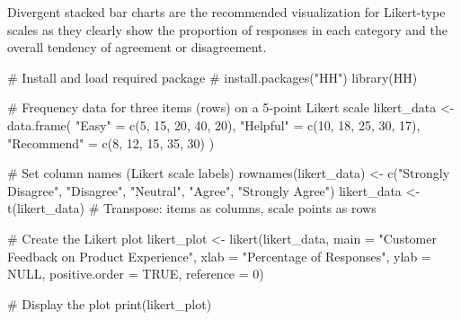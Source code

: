 \documentclass[
  letterpaper,
  DIV=11,
  numbers=noendperiod]{scrartcl}
\newenvironment{Shaded}{\begin{snugshade}}{\end{snugshade}}
\newcommand{\AttributeTok}[1]{\textcolor[rgb]{0.40,0.45,0.13}{#1}}
\newcommand{\CommentTok}[1]{\textcolor[rgb]{0.37,0.37,0.37}{#1}}
\newcommand{\ConstantTok}[1]{\textcolor[rgb]{0.56,0.35,0.01}{#1}}
\newcommand{\DecValTok}[1]{\textcolor[rgb]{0.68,0.00,0.00}{#1}}
\newcommand{\FunctionTok}[1]{\textcolor[rgb]{0.28,0.35,0.67}{#1}}
\newcommand{\NormalTok}[1]{\textcolor[rgb]{0.00,0.23,0.31}{#1}}
\newcommand{\OtherTok}[1]{\textcolor[rgb]{0.00,0.23,0.31}{#1}}
\newcommand{\StringTok}[1]{\textcolor[rgb]{0.13,0.47,0.30}{#1}}
\begin{document}
Divergent stacked bar charts are the recommended visualization for
Likert-type scales as they clearly show the proportion of responses in
each category and the overall tendency of agreement or disagreement.

\begin{Shaded}
\begin{Highlighting}[]
\CommentTok{\# Install and load required package}
\CommentTok{\# install.packages("HH")}
\FunctionTok{library}\NormalTok{(HH)}

\CommentTok{\# Frequency data for three items (rows) on a 5{-}point Likert scale}
\NormalTok{likert\_data }\OtherTok{\textless{}{-}} \FunctionTok{data.frame}\NormalTok{(}
  \StringTok{"Easy"} \OtherTok{=} \FunctionTok{c}\NormalTok{(}\DecValTok{5}\NormalTok{, }\DecValTok{15}\NormalTok{, }\DecValTok{20}\NormalTok{, }\DecValTok{40}\NormalTok{, }\DecValTok{20}\NormalTok{),}
  \StringTok{"Helpful"} \OtherTok{=} \FunctionTok{c}\NormalTok{(}\DecValTok{10}\NormalTok{, }\DecValTok{18}\NormalTok{, }\DecValTok{25}\NormalTok{, }\DecValTok{30}\NormalTok{, }\DecValTok{17}\NormalTok{),}
  \StringTok{"Recommend"} \OtherTok{=} \FunctionTok{c}\NormalTok{(}\DecValTok{8}\NormalTok{, }\DecValTok{12}\NormalTok{, }\DecValTok{15}\NormalTok{, }\DecValTok{35}\NormalTok{, }\DecValTok{30}\NormalTok{)}
\NormalTok{)}

\CommentTok{\# Set column names (Likert scale labels)}
\FunctionTok{rownames}\NormalTok{(likert\_data) }\OtherTok{\textless{}{-}} \FunctionTok{c}\NormalTok{(}\StringTok{"Strongly Disagree"}\NormalTok{, }\StringTok{"Disagree"}\NormalTok{, }\StringTok{"Neutral"}\NormalTok{, }\StringTok{"Agree"}\NormalTok{, }\StringTok{"Strongly Agree"}\NormalTok{)}
\NormalTok{likert\_data }\OtherTok{\textless{}{-}} \FunctionTok{t}\NormalTok{(likert\_data)  }\CommentTok{\# Transpose: items as columns, scale points as rows}

\CommentTok{\# Create the Likert plot}
\NormalTok{likert\_plot }\OtherTok{\textless{}{-}} \FunctionTok{likert}\NormalTok{(likert\_data,}
                      \AttributeTok{main =} \StringTok{"Customer Feedback on Product Experience"}\NormalTok{,}
                      \AttributeTok{xlab =} \StringTok{"Percentage of Responses"}\NormalTok{,}
                      \AttributeTok{ylab =} \ConstantTok{NULL}\NormalTok{,}
                      \AttributeTok{positive.order =} \ConstantTok{TRUE}\NormalTok{,}
                      \AttributeTok{reference =} \DecValTok{0}\NormalTok{)}

\CommentTok{\# Display the plot}
\FunctionTok{print}\NormalTok{(likert\_plot)}
\end{Highlighting}
\end{Shaded}
\end{document}

